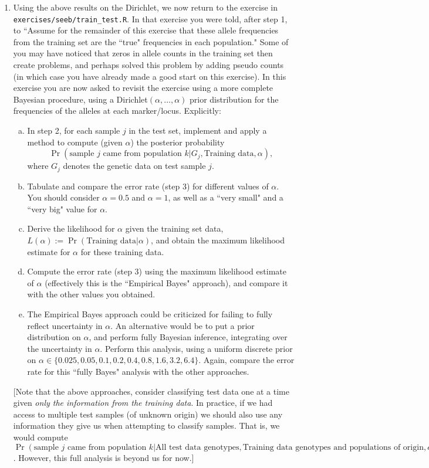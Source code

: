 \documentclass[12pt]{article}
\def\train{\text{Training data}}
\begin{document}
\begin{enumerate}
\item Using the above results on the Dirichlet, we now return to the exercise in \verb|exercises/seeb/train_test.R|. In that exercise you were told, after step 1, to ``Assume for the remainder of this exercise that these allele frequencies from the training set are the ``true" frequencies in each population." Some of you may have noticed that zeros in allele
counts in the training set then create problems, and perhaps solved this problem by adding pseudo counts (in which case you have already
made a good start on this exercise). In this exercise you are now asked to revisit the exercise using a more complete Bayesian procedure, 
using a Dirichlet$(\alpha,\dots,\alpha)$ prior distribution for the frequencies of the alleles at each marker/locus. Explicitly:
\begin{enumerate}[a)]
\item In step 2, for each sample $j$ in the test set, implement and apply a method to compute (given $\alpha$) the posterior probability 
$$\Pr(\text{sample $j$ came from population $k$} | G_j, \text{Training data}, \alpha),$$ 
where $G_j$ denotes the genetic data on test sample $j$. 
\item  Tabulate and compare the error rate (step 3) for different values of $\alpha$. 
You should consider $\alpha=0.5$ and $\alpha=1$, as well as a ``very small" and a ``very big" value for $\alpha$.
\item Derive the likelihood for $\alpha$ given the training set data, $L(\alpha) :=\Pr(\train | \alpha)$, and obtain the maximum likelihood estimate for $\alpha$
for these training data.
\item Compute the error rate (step 3) using the maximum likelihood estimate of $\alpha$ (effectively this is the ``Empirical Bayes" approach), and compare it with the other values you obtained.
\item The Empirical Bayes approach could be criticized for failing to fully reflect uncertainty in $\alpha$. An alternative would be to put a prior distribution on $\alpha$, and perform 
fully Bayesian inference, integrating over the uncertainty in $\alpha$. Perform this analysis, using a uniform discrete prior on $\alpha \in \{0.025,0.05,0.1,0.2,0.4,0.8,1.6,3.2,6.4\}$. Again, compare the error rate for this ``fully Bayes" analysis with the other approaches. 
\end{enumerate}
 [Note that the above approaches, consider classifying test data one at a time given {\it only the information from the training data}.
 In practice, if we had access to multiple test samples (of unknown origin) we should also use any information they
 give us when attempting to classify samples. That is, we would
compute $\Pr(\text{sample $j$ came from population $k$} | \text{All test data genotypes}, \text{Training data genotypes and populations of origin},\alpha)$. However, this full analysis is beyond us for now.]



\end{enumerate}
\end{document}
